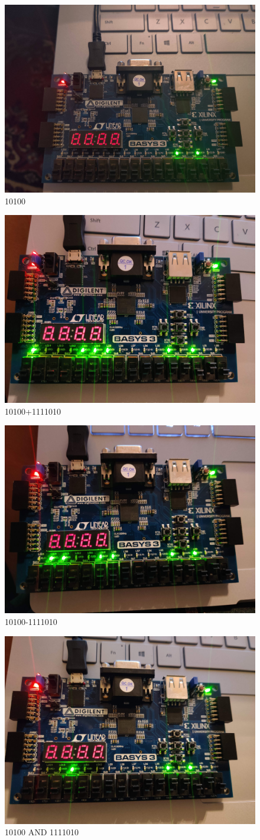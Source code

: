 \documentclass[11pt]{article}
\begin{document}
\begin{figure}[ht]\centering
	\includegraphics[width=.5\textwidth]{board1}
	\caption{10100}
	\label{fig:b3_1}			
\end{figure}

\begin{figure}[ht]\centering
	\includegraphics[width=.5\textwidth]{board2}
	\caption{10100+1111010}
	\label{fig:b3_2}			
\end{figure}

\begin{figure}[ht]\centering
	\includegraphics[width=.5\textwidth]{board3}
	\caption{10100-1111010}
	\label{fig:b3_3}			
\end{figure}

\begin{figure}[ht]\centering
	\includegraphics[width=.5\textwidth]{board4}
	\caption{10100 AND 1111010}
	\label{fig:b3_4}			
\end{figure}
\end{document}
